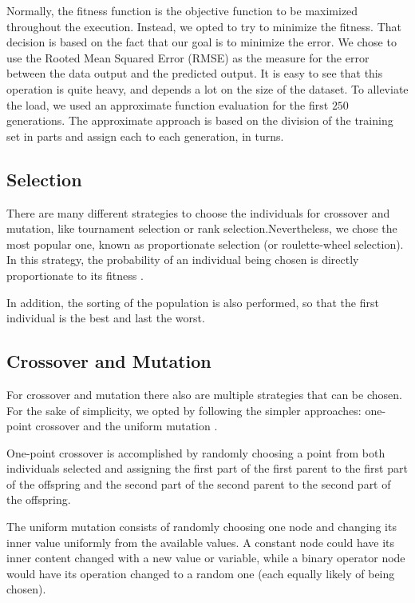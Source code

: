 \documentclass[runningheads]{llncs}
\begin{document}
Normally, the fitness function is the objective function to be maximized throughout the execution. Instead, we opted to try to minimize the fitness. That decision is based on the fact that our goal is to minimize the error. We chose to use the Rooted Mean Squared Error (RMSE) as the measure for the error between the data output and the predicted output. It is easy to see that this operation is quite heavy, and depends a lot on the size of the dataset. To alleviate the load, we used an approximate function evaluation \cite{beasley1993overview} for the first $250$ generations. The approximate approach is based on the division of the training set in parts and assign each to each generation, in turns.

\subsection{Selection}

There are many different strategies to choose the individuals for crossover and mutation, like tournament selection or rank selection.Nevertheless, we chose the most popular one, known as proportionate selection (or roulette-wheel selection). In this strategy, the probability of an individual being chosen is directly proportionate to its fitness \cite{martins2016gacuda}.

In addition, the sorting of the population is also performed, so that the first individual is the best and last the worst.

\subsection{Crossover and Mutation}

For crossover and mutation there also are multiple strategies that can be chosen. For the sake of simplicity, we opted by following the simpler approaches: one-point crossover and the uniform mutation \cite{martins2016gacuda}.

One-point crossover is accomplished by randomly choosing a point from both individuals selected and assigning the first part of the first parent to the first part of the offspring and the second part of the second parent to the second part of the offspring.

The uniform mutation consists of randomly choosing one node and changing its inner value uniformly from the available values. A constant node could have its inner content changed with a new value or variable, while a binary operator node would have its operation changed to a random one (each equally likely of being chosen).
\end{document}
